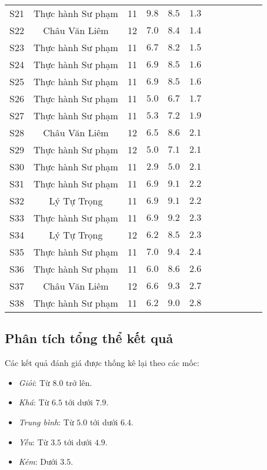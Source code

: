 \begin{longtable}{ScSlScScScSc}
	S21 & Thực hành Sư phạm & 11 & $9.8$ & $8.5$ & $1.3$ \\
	S22 & Châu Văn Liêm     & 12 & $7.0$ & $8.4$ & $1.4$ \\
	S23 & Thực hành Sư phạm & 11 & $6.7$ & $8.2$ & $1.5$ \\
	S24 & Thực hành Sư phạm & 11 & $6.9$ & $8.5$ & $1.6$ \\
	S25 & Thực hành Sư phạm & 11 & $6.9$ & $8.5$ & $1.6$ \\
	S26 & Thực hành Sư phạm & 11 & $5.0$ & $6.7$ & $1.7$ \\
	S27 & Thực hành Sư phạm & 11 & $5.3$ & $7.2$ & $1.9$ \\
	S28 & Châu Văn Liêm     & 12 & $6.5$ & $8.6$ & $2.1$ \\
	S29 & Thực hành Sư phạm & 12 & $5.0$ & $7.1$ & $2.1$ \\
	S30 & Thực hành Sư phạm & 11 & $2.9$ & $5.0$ & $2.1$ \\
	S31 & Thực hành Sư phạm & 11 & $6.9$ & $9.1$ & $2.2$ \\
	S32 & Lý Tự Trọng       & 11 & $6.9$ & $9.1$ & $2.2$ \\
	S33 & Thực hành Sư phạm & 11 & $6.9$ & $9.2$ & $2.3$ \\
	S34 & Lý Tự Trọng       & 12 & $6.2$ & $8.5$ & $2.3$ \\
	S35 & Thực hành Sư phạm & 11 & $7.0$ & $9.4$ & $2.4$ \\
	S36 & Thực hành Sư phạm & 11 & $6.0$ & $8.6$ & $2.6$ \\
	S37 & Châu Văn Liêm     & 12 & $6.6$ & $9.3$ & $2.7$ \\
	S38 & Thực hành Sư phạm & 11 & $6.2$ & $9.0$ & $2.8$ \\
\end{longtable}\par

\subsection{Phân tích tổng thể kết quả}

Các kết quả đánh giá được thống kê lại theo các mốc: \begin{itemize}
	\item \textit{Giỏi}: Từ $8.0$ trở lên.
	\item \textit{Khá}: Từ $6.5$ tới dưới $7.9$.
	\item \textit{Trung bình}: Từ $5.0$ tới dưới $6.4$.
	\item \textit{Yếu}: Từ $3.5$ tới dưới $4.9$.
	\item \textit{Kém}: Dưới $3.5$.
\end{itemize}\par

